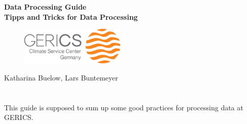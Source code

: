 \documentclass[12pt]{article}              %
\begin{document}

\titlepage
\vspace*{2cm}
\begin{center}
\textbf{\huge{Data Processing Guide}}\\
\vspace*{1cm}
\vspace{1cm}
\textbf{\Large Tipps and Tricks for Data Processing } \\
\vspace*{4cm}
\begin{figure} [h!tb]
\begin{center}
\includegraphics[width=5cm, natwidth=200, natheight=195]{./fig/Logo_GERICS_final.eps} \\
\end{center}
\end{figure}
\normalsize
\vspace*{5cm} 
{\Large{Katharina Buelow, Lars Buntemeyer}}\\
\Large
\vspace*{2cm}
\normalsize
\end{center}


\chapter*{}

This guide is supposed to sum up some good practices for processing data at GERICS. 

\setcounter{page}{2}                    %

\tableofcontents                        %




 



%
%
\appendix
%
%


\end{document}

